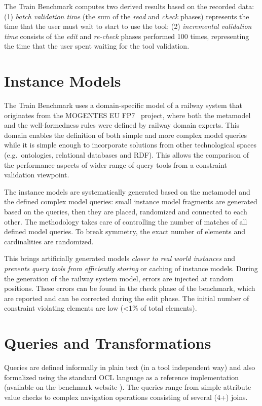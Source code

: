 The Train Benchmark computes two derived results based on the recorded data:
(1) \emph{batch validation time} (the sum of the \emph{read} and \emph{check} phases)
represents the time that the user must wait to start to use the tool; (2)
\emph{incremental validation time} consists of the \emph{edit} and
\emph{re-check} phases performed 100 times, representing the time that the
user spent waiting for the tool validation.


\section{Instance Models}
The Train Benchmark uses a domain-specific model of a railway system that
originates from the \mbox{MOGENTES} EU FP7~\cite{Mogentes} project, where both the metamodel and the
well-formedness rules were defined by railway domain experts. This domain
enables the definition of both simple and more complex model queries while it is
simple enough to incorporate solutions from other technological spaces
(e.g.\ ontologies, relational databases and RDF). This allows the comparison of
the performance aspects of wider range of query tools from a constraint
validation viewpoint.

The instance models are systematically generated based on the metamodel and the
defined complex model queries: small instance model fragments are generated
based on the queries, then they are placed, randomized and connected to each
other. The methodology takes care of controlling the number of matches of all
defined model queries. To break symmetry, the exact number of elements and
cardinalities are randomized.
 
This brings artificially generated models \emph{closer to real world instances}
and \emph{prevents query tools from efficiently storing} or caching of instance
models. During the generation of the railway system model, errors are injected
at random positions. These errors can be found in the check phase of the
benchmark, which are reported and can be corrected during the edit phase. The
initial number of constraint violating elements are low (<1\% of total
elements).
 
\section{Queries and Transformations}
Queries are defined informally in plain text (in a tool independent way) and
also formalized using the standard OCL language as a reference implementation
(available on the benchmark website \cite{TBwebsite}). The queries range from
simple attribute value checks to complex navigation operations consisting of
several (4+) joins.

